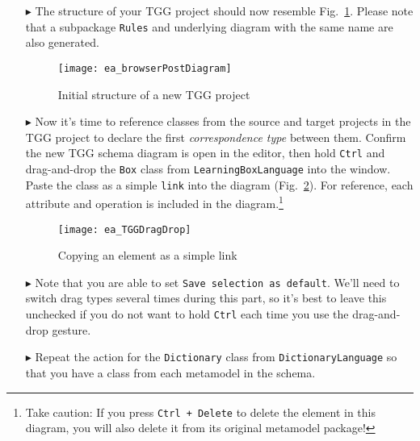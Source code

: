 \begin{itemize}
\item[$\blacktriangleright$] The structure of your TGG project should now resemble Fig.~\ref{ea:new_tgg_project}. Please note that a subpackage \texttt{Rules}
and underlying diagram with the same name are also generated.

\begin{figure}[htbp]
\begin{center}
  \texttt{[image: ea\_browserPostDiagram]}
  \caption{Initial structure of a new TGG project}  
  \label{ea:new_tgg_project}
\end{center}
\end{figure}
\end{itemize}


\begin{itemize}

\item[$\blacktriangleright$] Now it's time to reference classes from the source and target projects in the TGG project to declare the first \emph{correspondence
type} between them. Confirm the new TGG schema diagram is open in the editor,
then hold \texttt{Ctrl} and drag-and-drop the \texttt{Box} class from \texttt{Learning\-Box\-Language} into the window. Paste the class as a simple \texttt{link} into the diagram (Fig.~\ref{ea:TGGdragDrop}). For reference, each
attribute and operation is included in the diagram.\footnote{Take caution: If you press \texttt{Ctrl + Delete} to delete the element in this diagram,
you will also delete it from its original metamodel package!}

\vspace{0.5cm}

\begin{figure}[htbp]
\begin{center}
  \texttt{[image: ea\_TGGDragDrop]}
  \caption{Copying an element as a simple link} 
  \label{ea:TGGdragDrop}
\end{center}
\end{figure}

\item[$\blacktriangleright$] Note that you are able to set \texttt{Save selection as default}. We'll need to switch drag types several times during this
part, so it's best to leave this unchecked if you do not want to hold
\texttt{Ctrl} each time you use the drag-and-drop gesture.
 
\vspace{0.5cm}

\item[$\blacktriangleright$] Repeat the action for the \texttt{Dictionary} class from \texttt{DictionaryLanguage} so that you have a class from each metamodel in the
schema.


\end{itemize}
